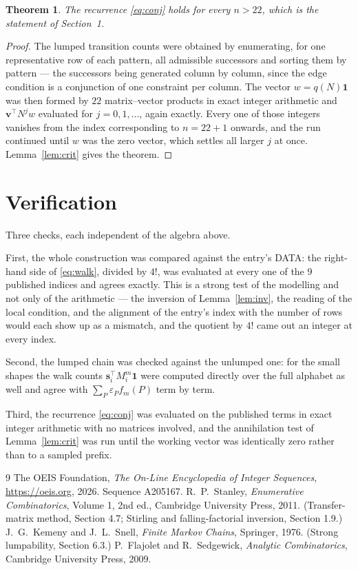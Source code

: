 \documentclass[11pt,a4paper]{article}
\theoremstyle{plain}
\newtheorem{theorem}{Theorem}
\theoremstyle{definition}
\begin{document}
\begin{theorem}
The recurrence \eqref{eq:conj} holds for every $n>22$, which is the statement of
Section~1.
\end{theorem}

\begin{proof}
The lumped transition counts were obtained by enumerating, for one representative row of
each pattern, all admissible successors and sorting them by pattern --- the successors being
generated column by column, since the edge condition is a conjunction of one constraint per
column. The vector $w=q(N)\mathbf{1}$ was then formed by $22$ matrix--vector products
in exact integer arithmetic and $\mathbf{v}^{\!\top}N^{j}w$ evaluated for
$j=0,1,\dots$, again exactly. Every one of those integers vanishes from the index
corresponding to $n=22+1$ onwards, and the run continued until $w$ was the zero vector,
which settles all larger $j$ at once. Lemma~\ref{lem:crit} gives the theorem.
\end{proof}

\section{Verification}

Three checks, each independent of the algebra above.

First, the whole construction was compared against the entry's DATA: the right-hand side of
\eqref{eq:walk}, divided by $4!$, was evaluated at every one of the $9$
published indices and agrees exactly. This is a strong test of the modelling and not only of
the arithmetic --- the inversion of Lemma~\ref{lem:inv}, the reading of the local
condition, and the alignment of the entry's index with the number of rows would each
show up as a mismatch, and the quotient by $4!$ came out an integer at every index.

Second, the lumped chain was checked against the unlumped one: for the small shapes the walk
counts $\mathbf{s}_i^{\!\top}M_i^{m}\mathbf{1}$ were computed directly over the full
alphabet as well and agree with $\sum_P\varepsilon_Pf_m(P)$ term by term.

Third, the recurrence \eqref{eq:conj} was evaluated on the published terms in exact integer
arithmetic with no matrices involved, and the annihilation test of Lemma~\ref{lem:crit} was
run until the working vector was identically zero rather than to a sampled prefix.

\begin{thebibliography}{9}
 The OEIS Foundation, \emph{The On-Line Encyclopedia of Integer
Sequences}, \url{https://oeis.org}, 2026. Sequence A205167.
 R.~P.~Stanley, \emph{Enumerative Combinatorics}, Volume 1, 2nd ed.,
Cambridge University Press, 2011. (Transfer-matrix method, Section 4.7; Stirling and
falling-factorial inversion, Section 1.9.)
 J.~G.~Kemeny and J.~L.~Snell, \emph{Finite Markov Chains}, Springer,
1976. (Strong lumpability, Section 6.3.)
 P.~Flajolet and R.~Sedgewick, \emph{Analytic Combinatorics}, Cambridge
University Press, 2009.
\end{thebibliography}
\end{document}
